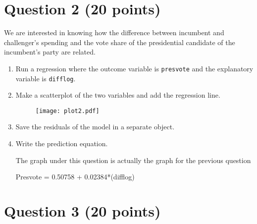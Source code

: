 \documentclass[12pt,letterpaper]{article}
\begin{document}
\section*{Question 2 (20 points)}
\noindent We are interested in knowing how the difference between incumbent and challenger's spending and the vote share of the presidential candidate of the incumbent's party are related.	\vspace{.25cm}
	\begin{enumerate}
		\item Run a regression where the outcome variable is \texttt{presvote} and the explanatory variable is \texttt{difflog}.	
		
		 
		
		
		\item Make a scatterplot of the two variables and add the regression line. 
		 
		
			\begin{figure}[h!]\centering
			
			\texttt{[image: plot2.pdf]}
			
		    \end{figure}
		
		\item Save the residuals of the model in a separate object.	
		
		
		 
		
		\item Write the prediction equation.
		
		The graph under this question is actually the graph for the previous question
		
		Presvote =  0.50758 + 0.02384*(difflog)
		
	\end{enumerate}
	
	\newpage	
\section*{Question 3 (20 points)}
\end{document}
